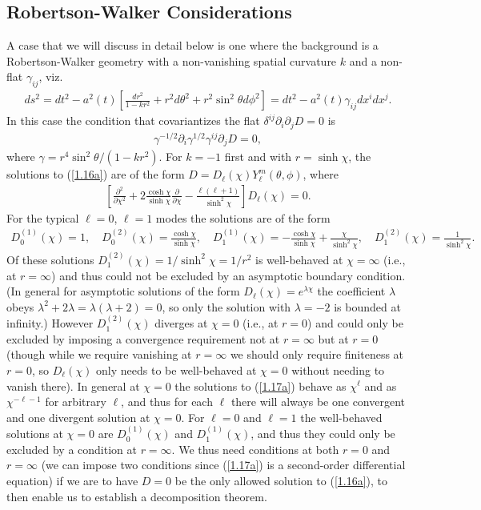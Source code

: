 \documentclass[aps,onecolumn,10pt]{revtex4}
\numberwithin{equation}{section}
\numberwithin{equation}{section}
\begin{document}
\subsection{Robertson-Walker Considerations}
\label{S1c}

A case that we will discuss in detail below is one where the background is a Robertson-Walker geometry with a non-vanishing spatial curvature $k$ and a non-flat $\gamma_{ij}$, viz.
%
\begin{align}
ds^2=dt^2-a^2(t)\left[\frac{dr^2}{1-kr^2}+r^2d\theta^2+r^2\sin^2\theta d\phi^2\right]=dt^2-a^2(t)\gamma_{ij}dx^idx^j.
\label{1.15a}
\end{align}
%
In this case the condition that covariantizes the flat $\delta^{ij}\partial_i\partial_jD=0$ is
%
\begin{align}
\gamma^{-1/2}\partial_i\gamma^{1/2}\gamma^{ij}\partial_jD=0,
\label{1.16a}
\end{align}
%
where $\gamma=r^4\sin^2\theta/(1-kr^2)$. For $k=-1$ first and with $r=\sinh\chi$, the solutions to (\ref{1.16a}) are of the form $D=D_{\ell}(\chi)Y^m_{\ell}(\theta,\phi)$, where
%
\begin{align}
\left[\frac{\partial^2}{\partial \chi^2}+2\frac{\cosh\chi}{\sinh\chi}\frac{\partial}{\partial \chi}-\frac{\ell(\ell+1)}{\sinh^2\chi}\right]D_{\ell}(\chi)=0.
\label{1.17a}
\end{align}
%
For the typical $\ell=0$, $\ell=1$ modes  the solutions are of the form
%
\begin{align}
D^{(1)}_{0}(\chi)=1,\quad D^{(2)}_{0}(\chi)=\frac{\cosh\chi}{\sinh\chi},\quad D^{(1)}_{1}(\chi)=-\frac{\cosh\chi}{\sinh\chi}+\frac{\chi}{\sinh^2\chi},\quad D^{(2)}_{1}(\chi)=\frac{1}{\sinh^2\chi}.
\label{1.18a}
\end{align}
%
Of these solutions $D^{(2)}_{1}(\chi)=1/\sinh^2\chi=1/r^2$ is well-behaved at $\chi=\infty$ (i.e., at $r=\infty$) and thus could not be excluded by an asymptotic boundary condition. (In general for asymptotic solutions of the form $D_{\ell}(\chi)=e^{\lambda\chi}$ the coefficient $\lambda$ obeys $\lambda^2+2\lambda=\lambda(\lambda+2)=0$, so only the solution with $\lambda=-2$ is bounded at infinity.) However $D^{(2)}_{1}(\chi)$ diverges at $\chi=0$ (i.e., at $r=0$) and could only be excluded by imposing a convergence requirement not at $r=\infty$ but at $r=0$ (though while we require vanishing at $r=\infty$ we should only require finiteness at $r=0$, so $D_{\ell}(\chi)$ only needs to be well-behaved at $\chi=0$ without needing to vanish there). In general at $\chi=0$ the solutions to (\ref{1.17a}) behave as $\chi^{\ell}$ and as $\chi^{-\ell-1}$ for arbitrary $\ell$, and thus for each $\ell$ there will always be one convergent and one divergent solution at $\chi=0$. For $\ell=0$ and $\ell=1$ the well-behaved solutions at $\chi=0$ are $D^{(1)}_{0}(\chi)$ and $D^{(1)}_{1}(\chi)$, and thus they could only be excluded by a condition at $r=\infty$. We thus need conditions at both $r=0$ and $r=\infty$ (we can impose two conditions since (\ref{1.17a}) is a second-order differential equation) if we are to have $D=0$ be the only allowed solution to (\ref{1.16a}), to then enable us to establish a decomposition theorem. 
\end{document}
